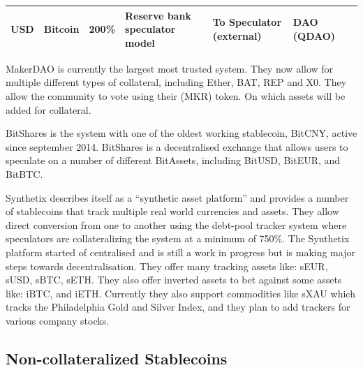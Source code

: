 \documentclass[english,]{IEEEtran}
\begin{document}
\begin{longtable}[]{@{}lllllll@{}}
\begin{minipage}[t]{0.04\columnwidth}
USD\strut
\end{minipage} & \begin{minipage}[t]{0.10\columnwidth}\raggedright\strut
Bitcoin\strut
\end{minipage} & \begin{minipage}[t]{0.06\columnwidth}\raggedright\strut
200\%\strut
\end{minipage} & \begin{minipage}[t]{0.16\columnwidth}\raggedright\strut
Reserve bank speculator model\strut
\end{minipage} & \begin{minipage}[t]{0.20\columnwidth}\raggedright\strut
To Speculator (external)\strut
\end{minipage} & \begin{minipage}[t]{0.12\columnwidth}\raggedright\strut
DAO (QDAO)\strut
\end{minipage}\tabularnewline
\bottomrule
\end{longtable}

MakerDAO is currently the largest most trusted system. They now allow
for multiple different types of collateral, including Ether, BAT, REP
and X0. They allow the community to vote using their (MKR) token. On
which assets will be added for collateral.

BitShares is the system with one of the oldest working stablecoin,
BitCNY, active since september 2014. BitShares is a decentralised
exchange that allows users to speculate on a number of different
BitAssets, including BitUSD, BitEUR, and BitBTC.

Synthetix describes itself as a ``synthetic asset platform'' and
provides a number of stablecoins that track multiple real world
currencies and assets. They allow direct conversion from one to another
using the debt-pool tracker system where speculators are collateralizing
the system at a minimum of 750\%. The Synthetix platform started of
centralised and is still a work in progress but is making major steps
towards decentralisation. They offer many tracking assets like: sEUR,
sUSD, sBTC, sETH. They also offer inverted assets to bet against some
assets like: iBTC, and iETH. Currently they also support commodities
like sXAU which tracks the Philadelphia Gold and Silver Index, and they
plan to add trackers for various company stocks.

\subsection{Non-collateralized
Stablecoins}\label{non-collateralized-stablecoins}
\end{document}
